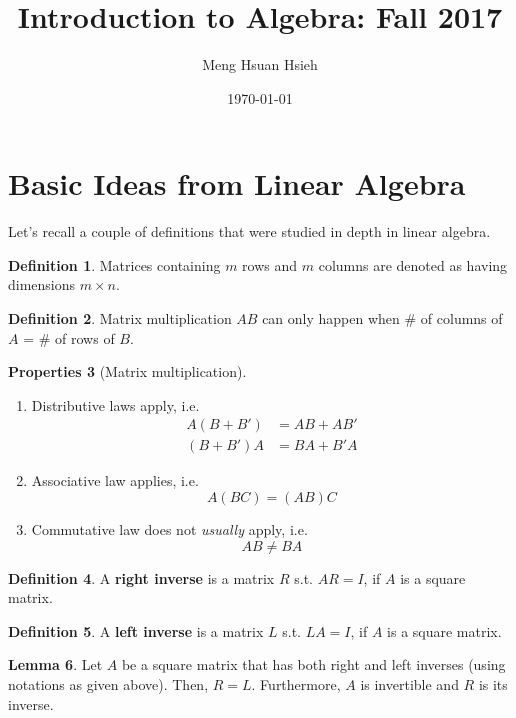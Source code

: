 \documentclass[11pt]{amsart} %
\title{Introduction to Algebra: Fall 2017}
\author{Meng Hsuan Hsieh}
\date{\today}
\theoremstyle{definition}
\newtheorem{definition}{Definition}[section]
\newtheorem{lemma}[definition]{Lemma}
\newtheorem{properties}[definition]{Properties}
\theoremstyle{definition}
\numberwithin{equation}{section}
\begin{document}
\sloppy
\maketitle

\tableofcontents


\section{Basic Ideas from Linear Algebra}
Let's recall a couple of definitions that were studied in depth in linear algebra.


\begin{definition}
	Matrices containing $m$ rows and $m$ columns are denoted as having dimensions $m \times n$.
\end{definition}

\begin{definition}
	Matrix multiplication $AB$ can only happen when $\#$ of columns of $A$ = $\#$ of rows of $B$.
\end{definition}

\begin{properties}[Matrix multiplication]
	\begin{enumerate}[  label=(\alph*)]
		\item Distributive laws apply, i.e.
		$$ \begin{aligned}
		A(B+ B') &= AB + AB' \\
				(B+ B')A &= BA + B'A
		\end{aligned} $$
		
		\item Associative law applies, i.e.
		$$ A(BC) = (AB)C $$

		\item Commutative law does not \textit{usually} apply, i.e.
		$$  AB \neq BA $$
	\end{enumerate}
\end{properties}

\begin{definition}
	A \textbf{right inverse} is a matrix $R$ s.t. $AR = I$, if $A$ is a square matrix.
\end{definition}

\begin{definition}
	A \textbf{left inverse} is a matrix $L$ s.t. $LA = I$, if $A$ is a square matrix.
\end{definition}

\begin{lemma}
	Let $A$ be a square matrix that has both right and left inverses (using notations as given above). Then, $R=L$. Furthermore, $A$ is invertible and $R$ is its inverse.
\end{lemma}
\end{document}
